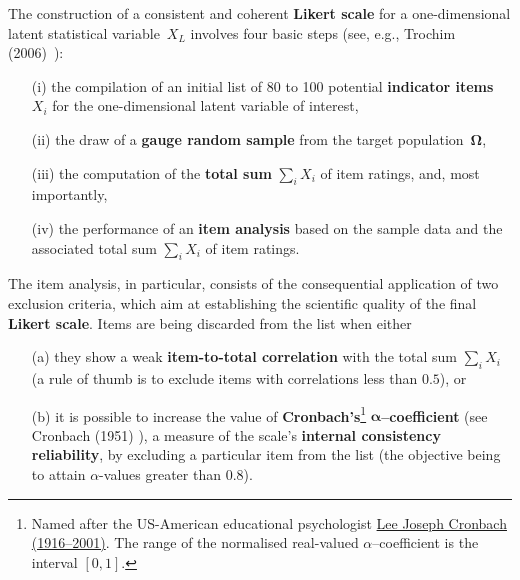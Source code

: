 \medskip
\noindent
The construction of a consistent and coherent \textbf{Likert scale} 
for a one-dimensional latent statistical variable~$X_{L}$ involves 
four basic steps (see, e.g., Trochim (2006)~):\\[-5mm]
%
\begin{itemize}
\item[(i)] the compilation of an initial list of 80 to 100 
potential \textbf{indicator items} $X_{i}$ for the one-dimensional 
latent variable of interest,\\[-5mm]

\item[(ii)] the draw of a \textbf{gauge random sample} from the 
target population~$\boldsymbol{\Omega}$,\\[-5mm]

\item[(iii)] the computation of the \textbf{total sum} 
${\displaystyle\sum_{i}X_{i}}$ of item ratings, and, most 
importantly, \\[-5mm]

\item[(iv)] the performance of an \textbf{item analysis} based on
the sample data and the associated total sum 
${\displaystyle\sum_{i}X_{i}}$ of item ratings.\\[-5mm]
\end{itemize}
%
The item analysis, in particular, consists of the consequential 
application of two exclusion criteria, which aim at establishing 
the scientific quality of the final \textbf{Likert scale}. Items
are being discarded from the list when either\\[-6mm]
%
\begin{itemize}
\item[(a)] they show a weak \textbf{item-to-total 
correlation} with the total sum ${\displaystyle\sum_{i}X_{i}}$ (a 
rule of thumb is to exclude items with correlations less than 
$0.5$), or\\[-6mm]
  
\item[(b)] it is possible to increase the value of
\textbf{Cronbach's}\footnote{Named 
after the US-American educational psychologist
\href{http://en.wikipedia.org/wiki/Lee_Cronbach}{Lee Joseph 
Cronbach (1916--2001)}. The range of the normalised real-valued
$\alpha$--coefficient is the interval $[0,1]$.} 
$\boldsymbol{\alpha}$\textbf{--coefficient} (see Cronbach (1951) 
), a measure of the scale's \textbf{internal
consistency reliability}, by excluding a particular item from the
list (the objective being to attain $\alpha$-values greater than
$0.8$).\\[-6mm]
\end{itemize}
